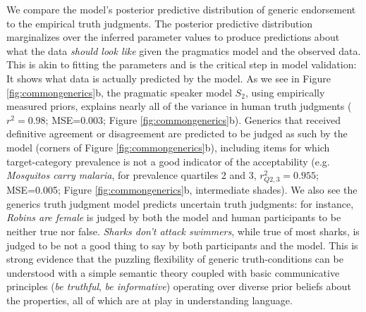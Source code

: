 \documentclass[12pt,letterpaper]{article}
\begin{document}
We compare the model's posterior predictive distribution of generic endorsement to the empirical truth judgments.
The posterior predictive distribution marginalizes over the inferred parameter values to produce predictions about what the data \emph{should look like} given the pragmatics model and the observed data. 
This is akin to fitting the parameters and is the critical step in model validation: It shows what data is actually predicted by the model. 
As we see in Figure \ref{fig:commongenerics}b, the pragmatic speaker model $S_2$, using empirically measured priors, explains nearly all of the variance in human truth judgments ($r^2=0.98$; MSE=0.003; Figure \ref{fig:commongenerics}b). 
Generics that received definitive agreement or disagreement are predicted to be judged as such by the model (corners of Figure \ref{fig:commongenerics}b), including items for which target-category prevalence is not a good indicator of the acceptability (e.g. \emph{Mosquitos carry malaria}, for prevalence quartiles 2 and 3, $r_{Q2,3}^2=0.955$; MSE=0.005; Figure \ref{fig:commongenerics}b, intermediate shades).
We also see the generics truth judgment model predicts uncertain truth judgments: for instance, \emph{Robins are female} is judged by both the model and human participants to be neither true nor false.
\emph{Sharks don't attack swimmers}, while true of most sharks, is judged to be not a good thing to say by both participants and the model.
This is strong evidence that the puzzling flexibility of generic truth-conditions can be understood with a simple semantic theory coupled with basic communicative principles (\emph{be truthful}, \emph{be informative}) operating over diverse prior beliefs about the properties, all of which are at play in understanding language. 

%
\end{document}
